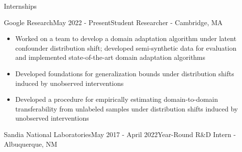\documentclass{resume} %
\begin{document}
\begin{rSection}{Internships}
\begin{rSubsection}{Google Research}{May 2022 - Present}{Student Researcher - Cambridge, MA}

\begin{itemize}
    \item Worked on a team to develop a domain adaptation algorithm under latent confounder distribution shift;
    developed semi-synthetic data for evaluation and implemented state-of-the-art domain adaptation algorithms
    \item Developed foundations for generalization bounds under distribution shifts induced 
     by unobserved interventions
    \item Developed a procedure for empirically estimating domain-to-domain transferability from
     unlabeled samples under distribution shifts induced by unobserved interventions
\end{itemize}

\end{rSubsection}

\begin{rSubsection}{Sandia National Laboratories}{May 2017 - April 2022}{Year-Round R\&D Intern - Albuquerque, NM}


\end{rSubsection}
\end{rSection}
\end{document}
